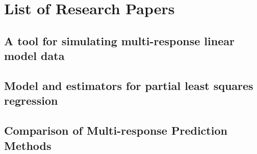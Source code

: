 \documentclass[11pt,twoside,openright,titlepage,
  headinclude,footinclude,BCOR=5mm,
  numbers=noenddot,cleardoublepage=empty,
  tablecaptionabove, dottedtoc,
  bibliography=totoc]{scrreprt}
\begin{document}
  \renewcommand\refname{References}
  


\nocite{*}

\appendix
\part*{List of Research Papers}
\par\chapter{A tool for simulating multi-response linear model data}
\cleardoublepage

\par\chapter{Model and estimators for partial least squares regression}
\cleardoublepage

\par\chapter{Comparison of Multi-response Prediction Methods}
\cleardoublepage


\end{document}
